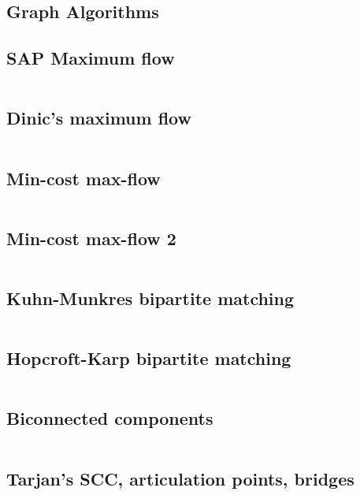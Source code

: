 \documentclass[letterpaper,landscape]{article}
\begin{document}
\begingroup
\let\cleardoublepage\clearpage
\endgroup

\begin{multicols*}{2}


  \tableofcontents
  \clearpage
  
  \section{Graph Algorithms}

  \subsection{SAP Maximum flow}
  \inputminted{cpp}{src/graph_maxflow.cpp}
  
  \subsection{Dinic's maximum flow}
  \inputminted{cpp}{src/graph_dinic.cpp}

  \subsection{Min-cost max-flow}
  \inputminted{cpp}{src/graph_mincost_maxflow.cpp}

  \subsection{Min-cost max-flow 2}
  \inputminted{cpp}{src/graph_mincost_maxflow_2.cpp}

  \subsection{Kuhn-Munkres bipartite matching}
  \inputminted{cpp}{src/KM.cpp}

  \subsection{Hopcroft-Karp bipartite matching}
  \inputminted{cpp}{src/graph_hopcroft_karp.cpp}

  \subsection{Biconnected components}
  \inputminted{cpp}{src/graph_bcc.cpp}

  \subsection{Tarjan's SCC, articulation points, bridges}
  \inputminted{cpp}{src/graph_scc.cpp}
  

\end{multicols*}
\end{document}
